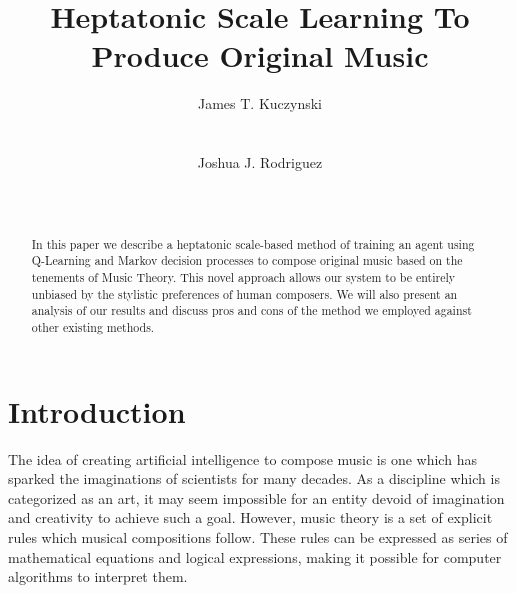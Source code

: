 \documentclass{chi2009}
\begin{document}
\setlength{\paperheight}{11in}
\setlength{\paperwidth}{8.5in}
\setlength{\pdfpageheight}{\paperheight}
\setlength{\pdfpagewidth}{\paperwidth}

\toappear{}

\title{Heptatonic Scale Learning To Produce Original Music}
\author{
  \alignauthor James T. Kuczynski\\
    \\
    \\
  \alignauthor Joshua J. Rodriguez\\
    \\
    \\
}

\maketitle

\begin{abstract}
In this paper we describe a heptatonic scale-based method of training an agent using Q-Learning and Markov decision processes to compose original music based on the tenements of Music Theory.  This novel approach allows our system to be entirely unbiased by the stylistic preferences of human composers.  We will also present an analysis of our results and discuss pros and cons of the method we employed against other existing methods.

\end{abstract}




\section{Introduction}

The idea of creating artificial intelligence to compose music is one which has sparked the imaginations of scientists for many decades.  As a discipline which is categorized as an art, it may seem impossible for an entity devoid of imagination and creativity to achieve such a goal.  However, music theory is a set of explicit rules which musical compositions follow.  These rules can be expressed as series of mathematical equations and logical expressions, making it possible for computer algorithms to interpret them.
\end{document}
